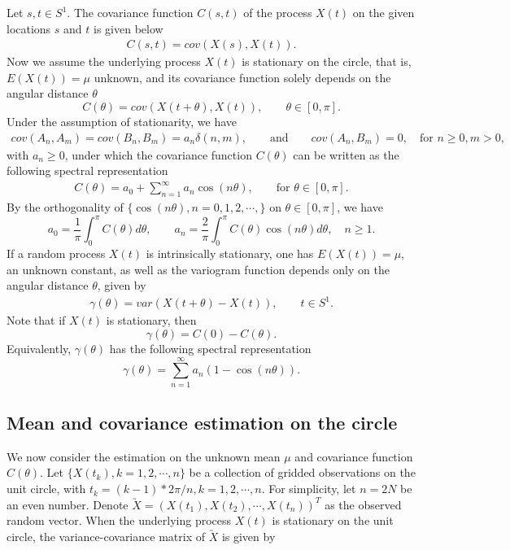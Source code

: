 Let $s, t \in S^1$. The covariance function $C(s, t)$ of the process $X(t)$ on the given locations $s$ and $t$ is given below
\begin{eqnarray*}
C(s, t) = cov(X(s), X(t)).
\end{eqnarray*}
Now we assume the underlying process $X(t)$ is stationary on the circle, that is, $E(X(t)) = \mu$ unknown, and its covariance function solely depends on the angular distance $\theta$
\[
C(\theta) = cov(X(t+\theta), X(t)), \quad \quad \theta \in [0, \pi].
\]
Under the assumption of stationarity, we have
\begin{eqnarray*}
cov(A_n, A_m) = cov(B_n, B_m) = a_n \delta(n, m), \quad \quad \mbox{and} \quad \quad cov(A_n, B_m) = 0, \quad \mbox{for $n \ge 0, m > 0$},
\end{eqnarray*}
with $a_n \ge 0$, under which the covariance function $C(\theta)$ can be written as the following spectral representation
\begin{eqnarray*}
C(\theta) = a_0 + \sum_{n=1}^\infty a_n \cos(n\theta), \quad \quad \mbox{for $\theta \in [0, \pi]$}.
\end{eqnarray*}
By the orthogonality of $\{\cos(n\theta), n = 0, 1, 2, \cdots,\}$ on $\theta \in [0, \pi]$, we have
\[
a_0 = \frac{1}{\pi}\int_0^\pi C(\theta)d\theta, \quad \quad a_n = \frac{2}{\pi}\int_0^\pi C(\theta)\cos(n\theta)d\theta, \quad n \ge 1.
\]
If a random process $X(t)$ is intrinsically stationary, one has $E(X(t)) = \mu$, an unknown constant, as well as the variogram function depends only on the angular distance $\theta$, given by
\begin{eqnarray*}
\gamma(\theta) = var(X(t+\theta) - X(t)), \quad \quad t \in S^1.
\end{eqnarray*}
Note that if $X(t)$ is stationary, then
\[
\gamma(\theta) = C(0) - C(\theta).
\]
Equivalently, $\gamma(\theta)$ has the following spectral representation
\[
\gamma(\theta) = \sum_{n = 1}^\infty a_n (1 - \cos(n\theta)).
\]



\subsection{Mean and covariance estimation on the circle}

We now consider the estimation on the unknown mean $\mu$ and covariance function $C(\theta)$. Let $\{X(t_k), k = 1, 2, \cdots, n\}$ be a collection of gridded observations on the unit circle, with $t_k = (k-1)*2\pi/n, k = 1, 2, \cdots, n$. For simplicity, let $n = 2N$ be an even number. Denote $\utilde{X} = (X(t_1), X(t_2), \cdots, X(t_n))^T$ as the observed random vector. When the underlying process $X(t)$ is stationary on the unit circle, the variance-covariance matrix of $\utilde{X}$ is given by

